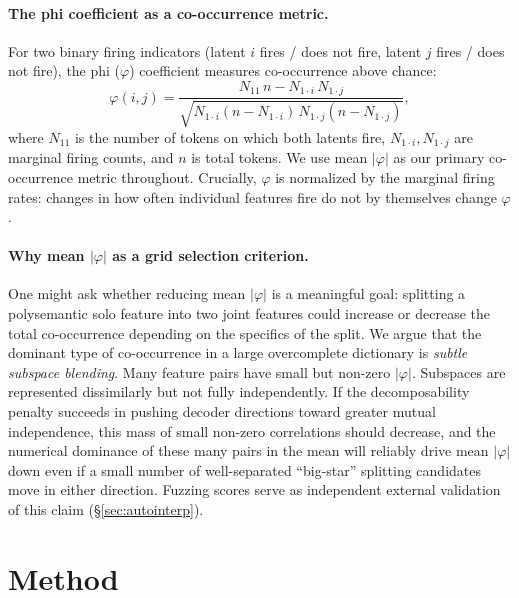 \documentclass{article} %
\begin{document}
\paragraph{The phi coefficient as a co-occurrence metric.}
For two binary firing indicators (latent $i$ fires / does not fire, latent $j$
fires / does not fire), the phi ($\varphi$) coefficient measures co-occurrence
above chance:
\begin{equation}
  \varphi(i,j) = \frac{N_{11}\,n - N_{1\cdot i}\,N_{1\cdot j}}
    {\sqrt{N_{1\cdot i}(n-N_{1\cdot i})\,N_{1\cdot j}(n-N_{1\cdot j})}},
  \label{eq:phi}
\end{equation}
where $N_{11}$ is the number of tokens on which both latents fire,
$N_{1\cdot i},N_{1\cdot j}$ are marginal firing counts, and $n$ is total tokens.
We use mean $|\varphi|$ as our primary co-occurrence metric throughout.
Crucially, $\varphi$ is normalized by the marginal firing rates: changes in how
often individual features fire do not by themselves change $\varphi$.

\paragraph{Why mean $|\varphi|$ as a grid selection criterion.}
One might ask whether reducing mean $|\varphi|$ is a meaningful goal:
splitting a polysemantic solo feature into two joint features could increase
or decrease the total co-occurrence depending on the specifics of the split.
We argue that the dominant type of co-occurrence in a large overcomplete
dictionary is \emph{subtle subspace blending}. Many feature pairs have small but
non-zero $|\varphi|$. Subspaces are represented dissimilarly but not fully independently.
If the decomposability penalty succeeds in pushing decoder directions toward
greater mutual independence, this mass of small non-zero correlations should
decrease, and the numerical dominance of these many pairs in the mean
will reliably drive mean $|\varphi|$ down even if a small number of
well-separated ``big-star'' splitting candidates move in either direction.
Fuzzing scores serve as independent external validation of this claim (\S\ref{sec:autointerp}).

\section{Method}
\label{sec:method}
\end{document}
